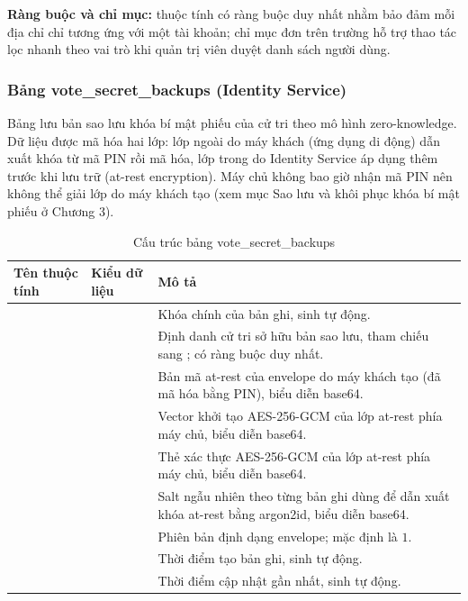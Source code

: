 \textbf{Ràng buộc và chỉ mục:} thuộc tính  có ràng buộc duy nhất nhằm bảo đảm mỗi địa chỉ chỉ tương ứng với một tài khoản; chỉ mục đơn trên trường  hỗ trợ thao tác lọc nhanh theo vai trò khi quản trị viên duyệt danh sách người dùng.

\subsubsection{Bảng {vote\_secret\_backups} (Identity Service)}

Bảng  lưu bản sao lưu khóa bí mật phiếu của cử tri theo mô hình zero-knowledge. Dữ liệu được mã hóa hai lớp: lớp ngoài do máy khách (ứng dụng di động) dẫn xuất khóa từ mã PIN rồi mã hóa, lớp trong do Identity Service áp dụng thêm trước khi lưu trữ (at-rest encryption). Máy chủ không bao giờ nhận mã PIN nên không thể giải lớp do máy khách tạo (xem mục Sao lưu và khôi phục khóa bí mật phiếu ở Chương 3).

\begin{table}[H]
    \centering
    \small
    \setlength{\tabcolsep}{3pt}
    \caption{Cấu trúc bảng {vote\_secret\_backups}}
    \label{tab:db-vote-secret-backups}
    \begin{tabularx}{\textwidth}{|L{0.25}|L{0.25}|L{0.50}|}
    \hline
    \textbf{Tên thuộc tính} & \textbf{Kiểu dữ liệu} & \textbf{Mô tả} \\
    \hline
             &  & Khóa chính của bản ghi, sinh tự động. \\ \hline
         &  & Định danh cử tri sở hữu bản sao lưu, tham chiếu sang ; có ràng buộc duy nhất. \\ \hline
         &    & Bản mã at-rest của envelope do máy khách tạo (đã mã hóa bằng PIN), biểu diễn base64. \\ \hline
             &    & Vector khởi tạo AES-256-GCM của lớp at-rest phía máy chủ, biểu diễn base64. \\ \hline
        &    & Thẻ xác thực AES-256-GCM của lớp at-rest phía máy chủ, biểu diễn base64. \\ \hline
     &    & Salt ngẫu nhiên theo từng bản ghi dùng để dẫn xuất khóa at-rest bằng argon2id, biểu diễn base64. \\ \hline
        &       & Phiên bản định dạng envelope; mặc định là $1$. \\ \hline
      &  & Thời điểm tạo bản ghi, sinh tự động. \\ \hline
      &  & Thời điểm cập nhật gần nhất, sinh tự động. \\ \hline
    \end{tabularx}
\end{table}

